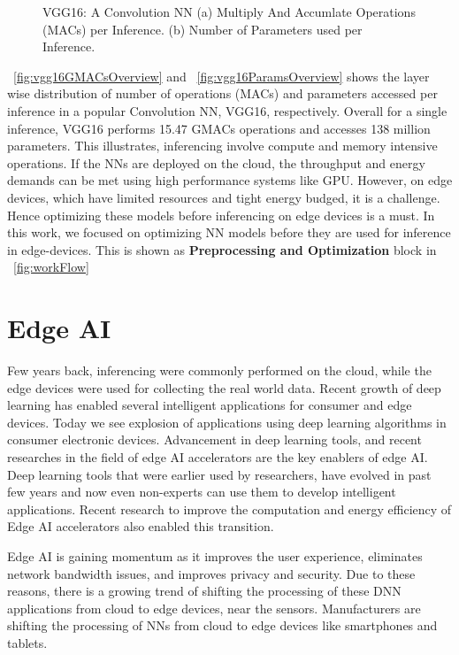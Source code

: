 \begin{figure}[!htb]
	\centering
	\captionsetup{font=sf}
	\hfil
	\caption{VGG16: A Convolution NN (a) Multiply And Accumlate Operations (MACs) per Inference. (b) Number of Parameters used per Inference.}
	\label{fig:MACAndParamsSize}
\end{figure}
\figurename{~\ref{fig:vgg16GMACsOverview}} and \figurename{~\ref{fig:vgg16ParamsOverview}} shows the layer wise distribution of number of operations (MACs) and parameters accessed per inference in a popular Convolution NN, VGG16, respectively. Overall for a single inference, VGG16 performs 15.47 GMACs operations and accesses 138 million parameters. This illustrates, inferencing involve compute and memory intensive operations. If the NNs are deployed on the cloud, the throughput and energy demands can be met using high performance systems like GPU. However, on edge devices, which have limited resources and tight energy budged, it is a challenge. Hence optimizing these models before inferencing on edge devices is a must. In this work, we focused on optimizing NN models before they are used for inference in edge-devices. This is shown as \textbf{Preprocessing and Optimization} block in \figurename{~\ref{fig:workFlow}}

\section{Edge AI}
Few years back, inferencing were commonly performed on the cloud, while the edge devices were used for collecting the real world data. Recent growth of deep learning has enabled several intelligent applications for consumer and edge devices. Today we see explosion of applications using deep learning algorithms in consumer electronic devices. Advancement in deep learning tools, and recent researches in the field of edge AI accelerators are the key enablers of edge AI. Deep learning tools that were earlier used by researchers, have evolved in past few years and now even non-experts can use them to develop intelligent applications. Recent research to improve the computation and energy efficiency of Edge AI accelerators also enabled this transition. 

Edge AI is gaining momentum as it improves the user experience, eliminates network bandwidth issues, and improves privacy and security. Due to these reasons, there is a growing trend of shifting the processing of these DNN applications from cloud to edge devices, near the sensors. Manufacturers are shifting the processing of NNs from cloud to edge devices like smartphones and tablets. 

